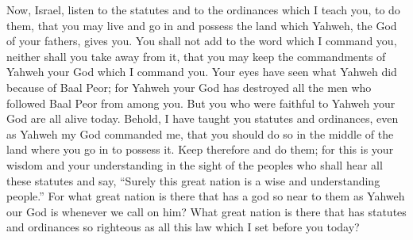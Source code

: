  Now, Israel, listen to the statutes and to the ordinances
which I teach you, to do them, that you may live and go in and possess
the land which Yahweh, the God of your fathers, gives you. 
You shall not add to the word which I command you, neither shall you
take away from it, that you may keep the commandments of Yahweh your God
which I command you.  Your eyes have seen what Yahweh did
because of Baal Peor; for Yahweh your God has destroyed all the men who
followed Baal Peor from among you.  But you who were
faithful to Yahweh your God are all alive today.  Behold, I
have taught you statutes and ordinances, even as Yahweh my God commanded
me, that you should do so in the middle of the land where you go in to
possess it.  Keep therefore and do them; for this is your
wisdom and your understanding in the sight of the peoples who shall hear
all these statutes and say, ``Surely this great nation is a wise and
understanding people.''  For what great nation is there that
has a god so near to them as Yahweh our God is whenever we call on him?
 What great nation is there that has statutes and ordinances
so righteous as all this law which I set before you today?

